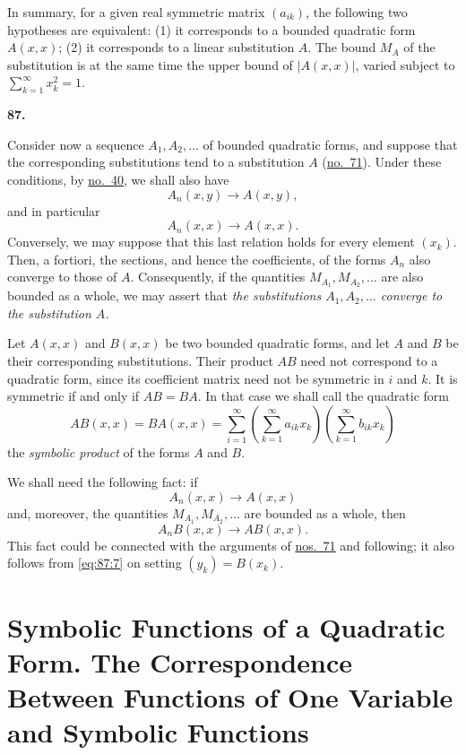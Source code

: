 \documentclass[
  paper=b5,
  fontsize=13pt,
  twoside=true,
  open=any,
  bookmarkpackage=false,
  chapterprefix=true,
  headings=normal
]{scrbook}
\theoremstyle{definition}
\newcommand{\numberedparagraph}[1]{%
  \par\medskip\phantomsection\label{sec:#1}%
  \noindent\textbf{#1.}\enspace
}
\begin{document}
In summary, for a given real symmetric matrix \((a_{ik})\), the following two
hypotheses are equivalent: (1) it corresponds to a bounded quadratic form
\(A(x,x)\); (2) it corresponds to a linear substitution \(A\).  The bound
\(M_A\) of the substitution is at the same time the upper bound of
\(\lvert A(x,x)\rvert\), varied subject to
\(\sum_{k=1}^{\infty}x_k^2=1\).

\numberedparagraph{87}
Consider now a sequence \(A_1,A_2,\ldots\) of bounded quadratic forms, and
suppose that the corresponding substitutions tend to a substitution \(A\)
(\hyperref[sec:71]{no.~71}).  Under these conditions, by
\hyperref[sec:40]{no.~40}, we shall also have
\begin{equation}
  A_n(x,y)\longrightarrow A(x,y),
  \tag{7}\label{eq:87:7}
\end{equation}
and in particular
\[
  A_n(x,x)\longrightarrow A(x,x).
\]
Conversely, we may suppose that this last relation holds for every element
\((x_k)\).  Then, a fortiori, the sections, and hence the coefficients, of the
forms \(A_n\) also converge to those of \(A\).  Consequently, if the quantities
\(M_{A_1},M_{A_2},\ldots\) are also bounded as a whole, we may assert that
\emph{the substitutions \(A_1,A_2,\ldots\) converge to the substitution \(A\).}

Let \(A(x,x)\) and \(B(x,x)\) be two bounded quadratic forms, and let \(A\) and
\(B\) be their corresponding substitutions.  Their product \(AB\) need not
correspond to a quadratic form, since its coefficient matrix need not be
symmetric in \(i\) and \(k\).  It is symmetric if and only if \(AB=BA\).  In
that case we shall call the quadratic form
\[
  AB(x,x)=BA(x,x)=\sum_{i=1}^{\infty}
  \left(\sum_{k=1}^{\infty}a_{ik}x_k\right)
  \left(\sum_{k=1}^{\infty}b_{ik}x_k\right)
\]
the \emph{symbolic product} of the forms \(A\) and \(B\).

We shall need the following fact: if
\[
  A_n(x,x)\longrightarrow A(x,x)
\]
and, moreover, the quantities \(M_{A_1},M_{A_2},\ldots\) are bounded as a whole,
then
\begin{equation}
  A_nB(x,x)\longrightarrow AB(x,x).
  \tag{8}\label{eq:87:8}
\end{equation}
This fact could be connected with the arguments of
\hyperref[sec:71]{nos.~71} and following; it also follows from
\eqref{eq:87:7} on setting \((y_k)=B(x_k)\).

\section{Symbolic Functions of a Quadratic Form. The Correspondence Between Functions of One Variable and Symbolic Functions}
\end{document}
